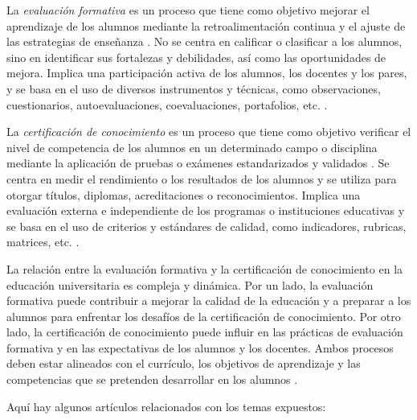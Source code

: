 \documentclass{article}
\begin{document}
La \textit{evaluación formativa} es un proceso que tiene como objetivo mejorar el aprendizaje de los alumnos mediante la retroalimentación continua y el ajuste de las estrategias de enseñanza \cite{fuente4}. No se centra en calificar o clasificar a los alumnos, sino en identificar sus fortalezas y debilidades, así como las oportunidades de mejora. Implica una participación activa de los alumnos, los docentes y los pares, y se basa en el uso de diversos instrumentos y técnicas, como observaciones, cuestionarios, autoevaluaciones, coevaluaciones, portafolios, etc. \cite{fuente4}.

La \textit{certificación de conocimiento} es un proceso que tiene como objetivo verificar el nivel de competencia de los alumnos en un determinado campo o disciplina mediante la aplicación de pruebas o exámenes estandarizados y validados \cite{fuente2}. Se centra en medir el rendimiento o los resultados de los alumnos y se utiliza para otorgar títulos, diplomas, acreditaciones o reconocimientos. Implica una evaluación externa e independiente de los programas o instituciones educativas y se basa en el uso de criterios y estándares de calidad, como indicadores, rubricas, matrices, etc. \cite{fuente2}.

La relación entre la evaluación formativa y la certificación de conocimiento en la educación universitaria es compleja y dinámica. Por un lado, la evaluación formativa puede contribuir a mejorar la calidad de la educación y a preparar a los alumnos para enfrentar los desafíos de la certificación de conocimiento. Por otro lado, la certificación de conocimiento puede influir en las prácticas de evaluación formativa y en las expectativas de los alumnos y los docentes. Ambos procesos deben estar alineados con el currículo, los objetivos de aprendizaje y las competencias que se pretenden desarrollar en los alumnos \cite{fuente4}.

Aquí hay algunos artículos relacionados con los temas expuestos:
\end{document}
